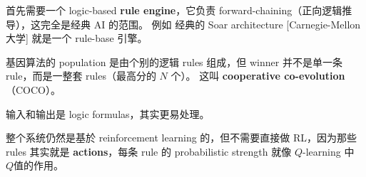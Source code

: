 \documentclass[12pt, orivec]{article}
\newcommand{\cc}[2]{#1}
\newcommand{\cc}[2]{#2}
\begin{document}


\cc{首先需要一个 logic-based \textbf{rule engine}，它负责 forward-chaining（正向逻辑推导），这完全是经典 AI 的范围。 例如 经典的 Soar architecture [Carnegie-Mellon 大学] 就是一个 rule-base 引擎。 %
}{
First you need a logic-based \textbf{rule engine}, which is responsible for forward-chaining, which is completely the scope of classic AI. For example, the classic Soar architecture [Carnegie-Mellon University] is a rule-base engine.}


\cc{基因算法的 population 是由个别的逻辑 rules 组成，但 winner 并不是单一条 rule，而是一整套 rules（最高分的 $N$ 个）。 这叫 \textbf{cooperative co-evolution}（COCO）。  
}{
The genetic algorithm's population is composed of individual logical rules, but the winner is not a single rule, but a set of rules (the highest score of $N$). This is called \textbf{cooperative co-evolution}(COCO).}

\cc{输入和输出是 logic formulas，其实更易处理。 
}{
Inputs and outputs are logic formulas, which are actually easier to handle.}

\cc{整个系统仍然是基於 reinforcement learning 的，但不需要直接做 RL，因为那些 rules 其实就是 \textbf{actions}，每条 rule  的 probabilistic strength 就像 $Q$-learning 中 $Q$值的作用。 
}{
The whole system is still based on reinforcement learning, but you don't need to do RL directly, because those rules are actually \textbf{actions}, and the probabilistic strength of each rule is like the $Q$ value in $Q$-learning.}
\end{document}
